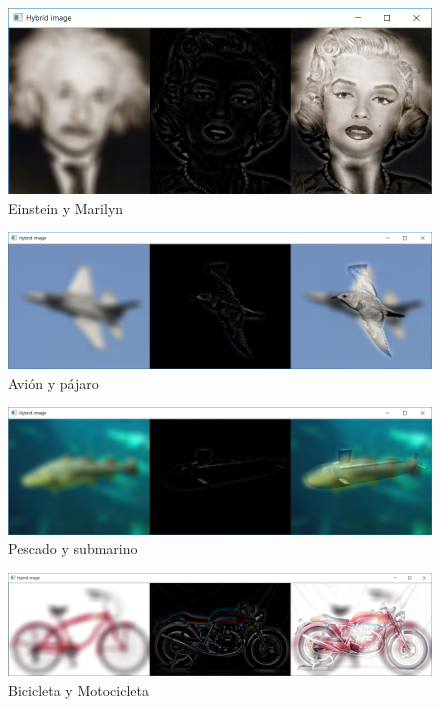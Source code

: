 \documentclass{article}
\begin{document}
\begin{figure}[h]
\centering
\includegraphics[scale=0.7]{3b2.PNG}
\caption{Einstein y Marilyn}
\end{figure}

\begin{figure}[h]
\centering
\includegraphics[scale=0.45]{3b3.PNG}
\caption{Avión y pájaro}
\end{figure}

\newpage
\begin{figure}[h]
\centering
\includegraphics[scale=0.45]{3b4.PNG}
\caption{Pescado y submarino}
\end{figure}

\begin{figure}[h]
\centering
\includegraphics[scale=0.45]{3b5.PNG}
\caption{Bicicleta y Motocicleta}
\end{figure}
\end{document}
